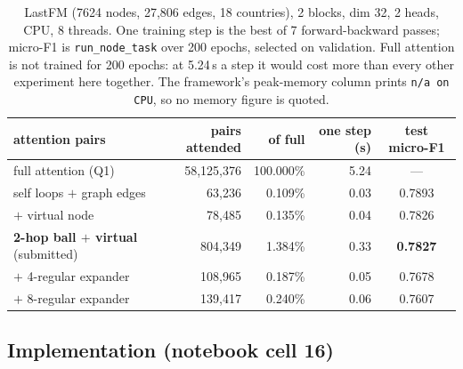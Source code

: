 \begin{table}[H]
\centering
\caption{LastFM (7624 nodes, 27{,}806 edges, 18 countries), 2 blocks, dim 32, 2 heads, CPU, 8 threads. One training step is the best of 7 forward-backward passes; micro-F1 is \texttt{run\_node\_task} over 200 epochs, selected on validation. Full attention is not trained for 200 epochs: at 5.24\,s a step it would cost more than every other experiment here together. The framework's peak-memory column prints \texttt{n/a on CPU}, so no memory figure is quoted.}
\label{p1:tab:q2lastfm}
\small
\begin{tabular}{lrrrc}
\toprule
attention pairs & pairs attended & of full & one step (s) & test micro-F1 \\
\midrule
full attention (Q1) & 58{,}125{,}376 & 100.000\% & 5.24 & --- \\
self loops $+$ graph edges & 63{,}236 & 0.109\% & 0.03 & 0.7893 \\
$+$ virtual node & 78{,}485 & 0.135\% & 0.04 & 0.7826 \\
\textbf{2-hop ball $+$ virtual} (submitted) & 804{,}349 & 1.384\% & 0.33 & \textbf{0.7827} \\
$+$ 4-regular expander & 108{,}965 & 0.187\% & 0.05 & 0.7678 \\
$+$ 8-regular expander & 139{,}417 & 0.240\% & 0.06 & 0.7607 \\
\bottomrule
\end{tabular}
\end{table}

\subsection*{Implementation (notebook cell 16)}

